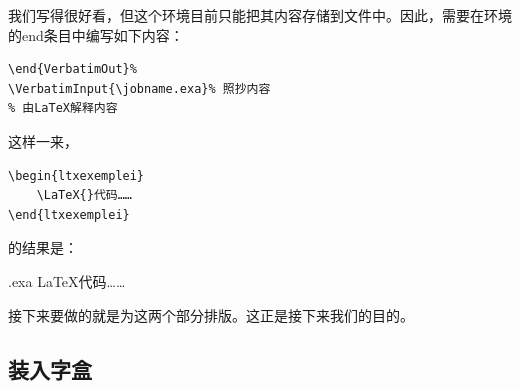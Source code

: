 我们写得很好看，但这个环境目前只能把其内容存储到文件中。因此，需要在环境的end条目中编写如下内容：

\begin{dmd}
\begin{verbatim}
\end{VerbatimOut}%
\VerbatimInput{\jobname.exa}% 照抄内容 
% 由LaTeX解释内容
\end{verbatim}
\end{dmd}

这样一来，

\newenvironment{ltxexemplei}{%
    \VerbatimEnvironment%
    \begin{VerbatimOut}[gobble=2]{\jobname.exa}}
    {%
    \end{VerbatimOut}%
    \VerbatimInput{\jobname.exa}%
    }

\newsavebox{\bitebxedminipage}

\newenvironment{boxedminipage}[2][c]{%
    \begin{lrbox}{\bitebxedminipage}%
    \begin{minipage}[#1]{#2}}{%
    \end{minipage}\end{lrbox}%
    \fbox{\usebox{\bitebxedminipage}}}

\begin{flushleft}
    \begin{boxedminipage}{.33\linewidth}
  \begin{dmd}
\begin{verbatim}
\begin{ltxexemplei}
    \LaTeX{}代码……
\end{ltxexemplei}
\end{verbatim}
  \end{dmd}
    \end{boxedminipage}%
    \hfill 的结果是：\hfill
    \begin{boxedminipage}{.4\linewidth}
\begin{ltxexemplei}
    \LaTeX{}代码……
\end{ltxexemplei}
  \end{boxedminipage}
  \end{flushleft}

接下来要做的就是为这两个部分排版。这正是接下来我们的目的。

\subsection{装入字盒}

